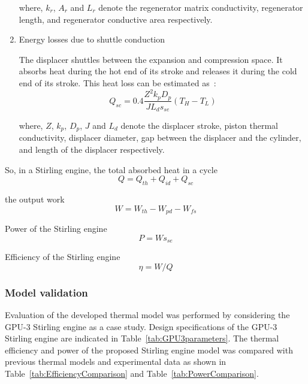 \begin{enumerate}[label=(\arabic*)]
where, $k_r$, $A_r$ and $L_r$ denote the regenerator matrix conductivity, regenerator length, and regenerator conductive area respectively.

\item Energy losses due to shuttle conduction

The displacer shuttles between the expansion and compression space. It absorbs heat during the hot end of its stroke and releases it during the cold end of its stroke. This heat loss can be estimated as~\cite{Timoumi2008}:
\begin{equation}
	Q_{sc} = 0.4\frac{Z^2k_pD_p}{JL_ds_{se}}(T_{H} - T_{L})
\end{equation}

where, $Z$, $k_p$, $D_p$, $J$ and $L_d$ denote the displacer stroke, piston thermal conductivity, displacer diameter, gap between the displacer and the cylinder, and length of the displacer respectively.

\end{enumerate}

So, in a Stirling engine, the total absorbed heat in a cycle
\begin{equation}
	Q = Q_{th} + Q_{id} + Q_{sc}
\end{equation}

the output work
\begin{equation}
	W = W_{th} - W_{pd} - W_{fs}
\end{equation}

Power of the Stirling engine
\begin{equation}
	P = Ws_{se}
	\label{Eq:P}
\end{equation}

Efficiency of the Stirling engine
\begin{equation}
	\eta = W/Q
	\label{Eq:eta}
\end{equation}


\subsubsection{Model validation}\label{sec:modelValidation}

Evaluation of the developed thermal model was performed by considering the GPU-3 Stirling engine as a case study. Design specifications of the GPU-3 Stirling engine are indicated in Table~\ref{tab:GPU3parameters}. The thermal efficiency and power of the proposed Stirling engine model was compared with previous thermal models and experimental data as shown in Table~\ref{tab:EfficiencyComparison} and Table~\ref{tab:PowerComparison}.

